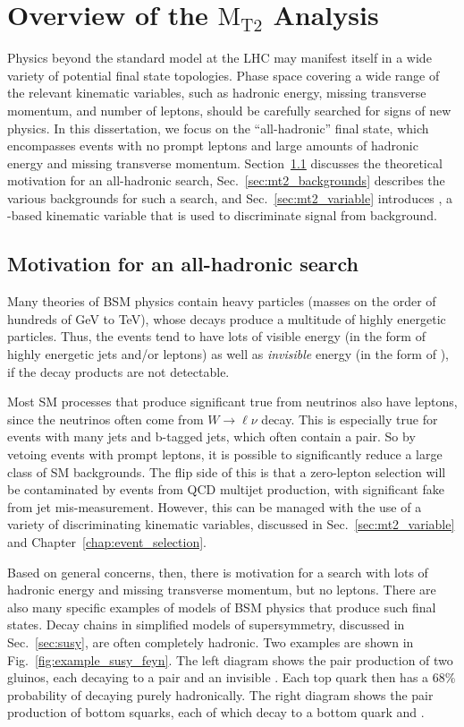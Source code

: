 \chapter{Overview of the \texorpdfstring{$\text{M}_\text{T2}$}{MT2} Analysis}

Physics beyond the standard model at the LHC may manifest itself in a wide variety of potential final state 
topologies. Phase space covering a wide range of the relevant kinematic variables, such as hadronic energy,
missing transverse momentum, and number of leptons, should be carefully searched for signs of new physics.
In this dissertation, we focus on the ``all-hadronic'' final state,
which encompasses events with no prompt leptons and large amounts of hadronic energy and missing transverse momentum.
Section~\ref{sec:motivation} discusses the theoretical motivation for an all-hadronic search, Sec.~\ref{sec:mt2_backgrounds}
describes the various backgrounds for such a search, and Sec.~\ref{sec:mt2_variable} introduces \mttwo, a \ptmiss-based kinematic
variable that is used to discriminate signal from background.

\section{Motivation for an all-hadronic search}
\label{sec:motivation}

Many theories of BSM physics contain heavy particles (masses on the order of hundreds of GeV to TeV), whose
decays produce a multitude of highly energetic particles. Thus, the events tend to have lots of visible
energy (in the form of highly energetic jets and/or leptons) as well as
\emph{invisible} energy (in the form of \ptmiss), if the decay products are not detectable.

Most SM processes that produce significant true \ptmiss from neutrinos also have leptons, since the
neutrinos often come from $W\to\ell\nu$ decay. This is especially true for events with many jets
and b-tagged jets, which often contain a \ttbar pair. So by vetoing events with prompt leptons, it is
possible to significantly reduce a large class of SM backgrounds. The flip side of this is that a
zero-lepton selection will be contaminated by events from QCD multijet production, with significant
fake \ptmiss from jet mis-measurement. However, this can be managed with the use of a variety of
discriminating kinematic variables, discussed in Sec.~\ref{sec:mt2_variable} and Chapter~\ref{chap:event_selection}.

Based on general concerns, then, there is motivation for a search with lots of hadronic energy and
missing transverse momentum, but no leptons. There are also many specific examples of models
of BSM physics that produce such final states. Decay chains in simplified models of supersymmetry, discussed in
Sec.~\ref{sec:susy}, are often completely hadronic. Two examples are shown in Fig.~\ref{fig:example_susy_feyn}.
The left diagram shows the pair production of two gluinos, each decaying to a \ttbar pair and an invisible \lsp.
Each top quark then has a 68\% probability of decaying purely hadronically. The right diagram shows
the pair production of bottom squarks, each of which decay to a bottom quark and \lsp.


